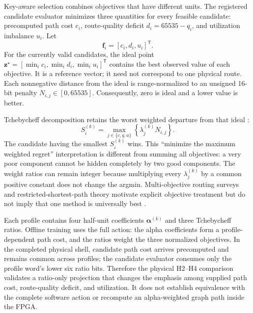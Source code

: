 Key-aware selection combines objectives that have different units. The registered
candidate evaluator minimizes three quantities for every feasible candidate:
precomputed path cost $c_i$, route-quality deficit $d_i=65535-q_i$, and utilization
imbalance $u_i$. Let
\begin{equation}
\boldsymbol f_i=[c_i,d_i,u_i]^{\mathsf T}.
\label{eq:bg-objective-vector}
\end{equation}
For the currently valid candidates, the ideal point
$\boldsymbol z^\star=[\min_i c_i,\min_i d_i,\min_i u_i]^{\mathsf T}$ contains the
best observed value of each objective. It is a reference vector; it need not
correspond to one physical route. Each nonnegative distance from the ideal is
range-normalized to an unsigned 16-bit penalty $N_{i,j}\in[0,65535]$.
Consequently, zero is ideal and a lower value is better.

Tchebycheff decomposition retains the worst weighted departure from that ideal
\cite{zhang2007moead}:
\begin{equation}
S_i^{(k)}=\max_{j\in\{c,q,u\}}
\left\{\lambda_{j}^{(k)}N_{i,j}\right\}.
\label{eq:bg-tchebycheff}
\end{equation}
The candidate having the smallest $S_i^{(k)}$ wins. This ``minimize the maximum
weighted regret'' interpretation is different from summing all objectives: a very
poor component cannot be hidden completely by two good components. The weight
ratios can remain integer because multiplying every $\lambda_j^{(k)}$ by a common
positive constant does not change the argmin. Multi-objective routing surveys and
restricted-shortest-path theory motivate explicit objective treatment but do not
imply that one method is universally best
\cite{zajac2021objectives,hassin1992restricted,deb2002nsga2}.

Each profile contains four half-unit coefficients
$\boldsymbol\alpha^{(k)}$ and three Tchebycheff ratios. Offline training uses the
full action: the alpha coefficients form a profile-dependent path cost, and the
ratios weight the three normalized objectives. In the completed physical shell,
candidate path cost arrives precomputed and remains common across profiles; the
candidate evaluator consumes only the profile word's lower six ratio bits.
Therefore the physical H2--H4 comparison validates a ratio-only projection that
changes the emphasis among supplied path cost, route-quality deficit, and
utilization. It does not establish equivalence with the complete software action or
recompute an alpha-weighted graph path inside the FPGA.

